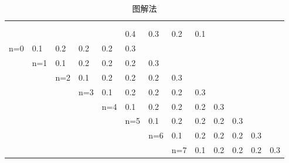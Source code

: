 \documentclass[cn,11pt,chinese,black,simple]{../elegantbook}
\begin{document}
\begin{solution}
    
\begin{longtable}{llllllll|l|llll}
    \caption{图解法} \\ 
    \\ 
    \endfirsthead
    
    \\ 
    \endhead 
  
    \\   
    \endfoot
  
    \endlastfoot
    \textbf{} & \textbf{} & \textbf{} & \textbf{} & \multicolumn{1}{l|}{}    & \multicolumn{1}{l|}{0.4} & \multicolumn{1}{l|}{0.3} & 0.2 & 0.1 &     &     &     &     \\ \cline{6-6}
    n=0       & 0.1       & 0.2       & 0.2       & \multicolumn{1}{l|}{0.2} & \multicolumn{1}{l|}{0.3} & \multicolumn{1}{l|}{}    &     &     &     &     &     &     \\ \cline{6-7}
              & n=1       & 0.1       & 0.2       & \multicolumn{1}{l|}{0.2} & \multicolumn{1}{l|}{0.2} & \multicolumn{1}{l|}{0.3} &     &     &     &     &     &     \\ \cline{6-8}
              &           & n=2       & 0.1       & \multicolumn{1}{l|}{0.2} & \multicolumn{1}{l|}{0.2} & \multicolumn{1}{l|}{0.2} & 0.3 &     &     &     &     &     \\ \cline{6-9}
              &           &           & n=3       & \multicolumn{1}{l|}{0.1} & \multicolumn{1}{l|}{0.2} & \multicolumn{1}{l|}{0.2} & 0.2 & 0.3 &     &     &     &     \\ \cline{6-9}
              &           &           &           & \multicolumn{1}{l|}{n=4} & \multicolumn{1}{l|}{0.1} & \multicolumn{1}{l|}{0.2} & 0.2 & 0.2 & 0.3 &     &     &     \\ \cline{6-9}
              &           &           &           &                          & \multicolumn{1}{l|}{n=5} & \multicolumn{1}{l|}{0.1} & 0.2 & 0.2 & 0.2 & 0.3 &     &     \\ \cline{7-9}
              &           &           &           &                          &                          & \multicolumn{1}{l|}{n=6} & 0.1 & 0.2 & 0.2 & 0.2 & 0.3 &     \\ \cline{8-9}
              &           &           &           &                          &                          &                          & n=7 & 0.1 & 0.2 & 0.2 & 0.2 & 0.3 \\ \cline{9-9}
\end{longtable}



\end{solution}
\end{document}
